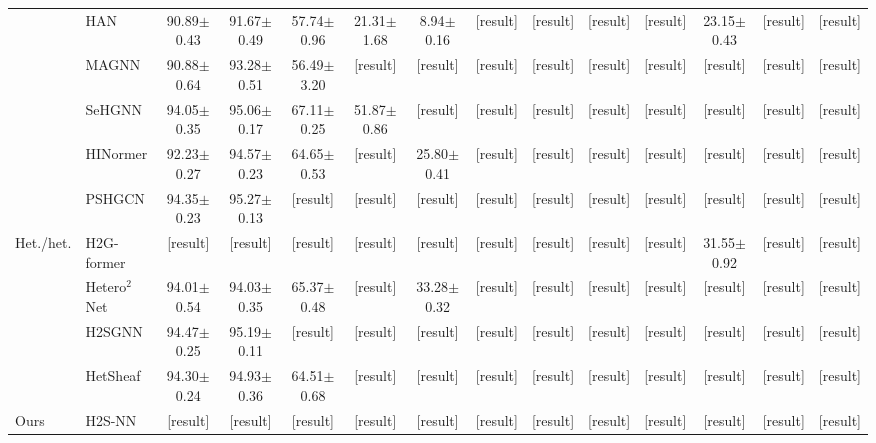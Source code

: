 \documentclass{article}
\newcommand{\method}{\textsc{H2S-NN}}
\newcommand{\res}{{\scriptsize[result]}}
\begin{document}
\begin{table}[!htbp]
\begin{tabular}{llcccccccccccc}
    & HAN & 90.89$\pm$0.43 & 91.67$\pm$0.49 & 57.74$\pm$0.96 & 21.31$\pm$1.68 & 8.94$\pm$0.16 & \res & \res & \res & \res & 23.15$\pm$0.43 & \res & \res \\
    & MAGNN & 90.88$\pm$0.64 & 93.28$\pm$0.51 & 56.49$\pm$3.20 & \res & \res & \res & \res & \res & \res & \res & \res & \res \\
    & SeHGNN & 94.05$\pm$0.35 & 95.06$\pm$0.17 & 67.11$\pm$0.25 & 51.87$\pm$0.86 & \res & \res & \res & \res & \res & \res & \res & \res \\
    & HINormer & 92.23$\pm$0.27 & 94.57$\pm$0.23 & 64.65$\pm$0.53 & \res & 25.80$\pm$0.41 & \res & \res & \res & \res & \res & \res & \res \\
    & PSHGCN & 94.35$\pm$0.23 & 95.27$\pm$0.13 & \res & \res & \res & \res & \res & \res & \res & \res & \res & \res \\
    \midrule
    \multirow{4}{*}{Het./het.} & H2G-former & \res & \res & \res & \res & \res & \res & \res & \res & \res & 31.55$\pm$0.92 & \res & \res \\
    & Hetero$^2$Net & 94.01$\pm$0.54 & 94.03$\pm$0.35 & 65.37$\pm$0.48 & \res & 33.28$\pm$0.32 & \res & \res & \res & \res & \res & \res & \res \\
    & H2SGNN & 94.47$\pm$0.25 & 95.19$\pm$0.11 & \res & \res & \res & \res & \res & \res & \res & \res & \res & \res \\
    & HetSheaf & 94.30$\pm$0.24 & 94.93$\pm$0.36 & 64.51$\pm$0.68 & \res & \res & \res & \res & \res & \res & \res & \res & \res \\
    \midrule
    Ours & \method{} & \res & \res & \res & \res & \res & \res & \res & \res & \res & \res & \res & \res \\
    \bottomrule
  \end{tabular}
\end{table}
\end{document}
